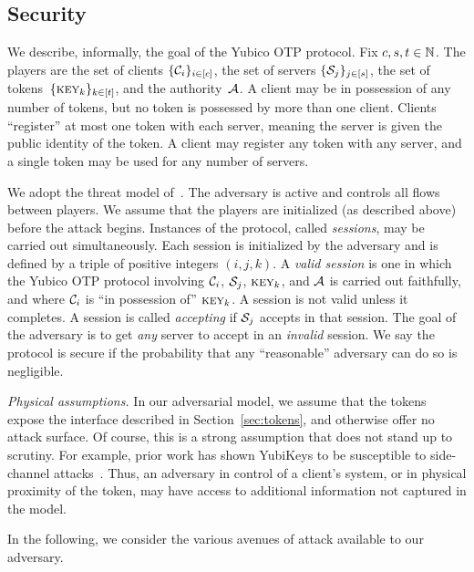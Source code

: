 \subsection{Security}
We describe, informally, the goal of the Yubico OTP protocol.
%
Fix $c,s,t\in\mathbb{N}$.  The players are the set of clients $\{\mathcal{C}_i\}_{i\in[c]}$,
the set of servers $\{\mathcal{S}_j\}_{j\in[s]}$, the set of
tokens~$\{\textsc{key}_k\}_{k\in[t]}$, and the authority~$\mathcal{A}$.
%
A client may be in possession of any number of tokens, but no token is possessed by
more than one client.
%
Clients ``register'' at most one token with each server, meaning the server is
given the public identity of the token.
%
A client may register any token with any server, and a single token may be used for
any number of servers.

We adopt the threat model of~\cite{bellare1993entity}. The adversary is
active and controls all flows between players. We assume that the players are
initialized (as described above) before the attack begins.
%
Instances of the protocol, called \emph{sessions}, may be carried out
simultaneously.
%
Each session is initialized by the adversary and is defined by a triple
of positive integers $(i, j, k)$.
%
A \emph{valid session} is one in which the Yubico OTP protocol involving
$\mathcal{C}_i$, $\mathcal{S}_j$, $\textsc{key}_k$, and $\mathcal{A}$ is carried out faithfully, and
where $\mathcal{C}_i$  is ``in possession of'' $\textsc{key}_k$.
%
A session is not valid unless it completes.
%
A session is called \emph{accepting} if $\mathcal{S}_j$ accepts in that session.
%
The goal of the adversary is to get \emph{any} server to accept in an
\emph{invalid} session. We say the protocol is secure if the probability that
any ``reasonable'' adversary can do so is negligible.

\textit{Physical assumptions.}
In our adversarial model, we assume that the tokens expose the interface
described in Section~\ref{sec:tokens}, and otherwise offer no attack surface.
%
Of course, this is a strong assumption that does not stand up to scrutiny. For
example, prior work has shown YubiKeys to be susceptible to side-channel
attacks~\cite{oswald2013side-channel}. Thus, an adversary in control of a
client's system, or in physical proximity of the token, may have access to
additional information not captured in the model.
%

In the following, we consider the various avenues of attack available to our
adversary.

